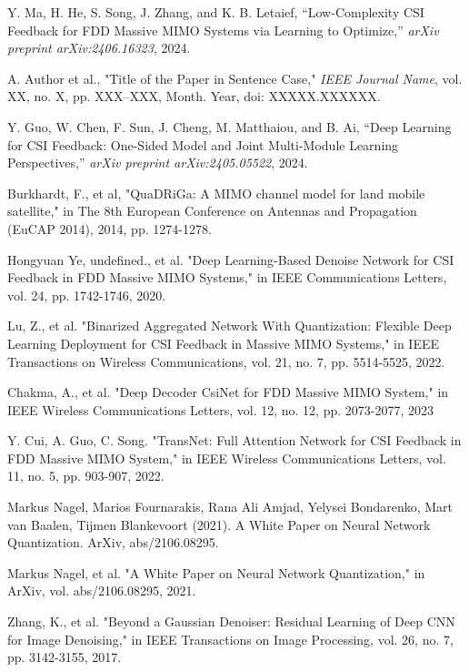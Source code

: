 \documentclass[lettersize,journal]{IEEEtran}
\begin{document}
\begin{thebibliography}{00}
	Y. Ma, H. He, S. Song, J. Zhang, and K. B. Letaief, 
	``Low-Complexity CSI Feedback for FDD Massive MIMO Systems via Learning to Optimize,'' 
	\textit{arXiv preprint arXiv:2406.16323}, 2024.

	A. Author et al., 
	"Title of the Paper in Sentence Case," 
	\textit{IEEE Journal Name}, 
	vol. XX, no. X, 
	pp. XXX--XXX, 
	Month. Year, 
	doi: XXXXX.XXXXXX.

	Y. Guo, W. Chen, F. Sun, J. Cheng, M. Matthaiou, and B. Ai, 
	``Deep Learning for CSI Feedback: One-Sided Model and Joint Multi-Module Learning Perspectives,'' 
	\textit{arXiv preprint arXiv:2405.05522}, 
	2024.

	Burkhardt, F., et al, "QuaDRiGa: A MIMO channel model for land mobile satellite," in The 8th European Conference on Antennas and Propagation (EuCAP 2014), 2014, pp. 1274-1278.
	
	Hongyuan Ye, undefined., et al. "Deep Learning-Based Denoise Network for CSI Feedback in FDD Massive MIMO Systems," in IEEE Communications Letters, vol. 24, pp. 1742-1746, 2020.
	
	Lu, Z., et al. "Binarized Aggregated Network With Quantization: Flexible Deep Learning Deployment for CSI Feedback in Massive MIMO Systems," in IEEE Transactions on Wireless Communications, vol. 21, no. 7, pp. 5514-5525, 2022.
	
	Chakma, A., et al. "Deep Decoder CsiNet for FDD Massive MIMO System," in IEEE Wireless Communications Letters, vol. 12, no. 12, pp. 2073-2077, 2023
	
	Y. Cui, A. Guo, C. Song. "TransNet: Full Attention Network for CSI Feedback in FDD Massive MIMO System," in IEEE Wireless Communications Letters, vol. 11, no. 5, pp. 903-907, 2022.
	
	Markus Nagel, Marios Fournarakis, Rana Ali Amjad, Yelysei Bondarenko, Mart van Baalen, Tĳmen Blankevoort (2021). A White Paper on Neural Network Quantization. ArXiv, abs/2106.08295.
	
	Markus Nagel, et al. "A White Paper on Neural Network Quantization," in ArXiv, vol. abs/2106.08295, 2021.
	
	Zhang, K., et al. "Beyond a Gaussian Denoiser: Residual Learning of Deep CNN for Image Denoising," in IEEE Transactions on Image Processing, vol. 26, no. 7, pp. 3142-3155, 2017.
	

\end{thebibliography}
\end{document}
